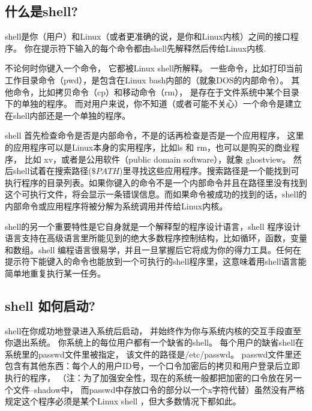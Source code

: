 \subsection{什么是shell?}
shell是你（用户）和Linux（或者更准确的说，是你和Linux内核）之间的接口程序。
你在提示符下输入的每个命令都由shell先解释然后传给Linux内核. \par
不论何时你键入一个命令，
它都被Linux shell所解释。
一些命令，比如打印当前工作目录命令（pwd），是包含在Linux bash内部的（就象DOS的内部命令）。
其他命令，比如拷贝命令（cp）和移动命令（rm），
是存在于文件系统中某个目录下的单独的程序。
而对用户来说，你不知道（或者可能不关心）一个命令是建立在shell内部还是一个单独的程序。
\par
shell 首先检查命令是否是内部命令，不是的话再检查是否是一个应用程序，
这里的应用程序可以是Linux本身的实用程序，比如ls 和 rm，也可以是购买的商业程序，
比如 xv，或者是公用软件（public domain software），就象 ghostview。
然后shell试着在搜索路径($\$PATH$)里寻找这些应用程序。搜索路径是一个能找到可执行程序的目录列表。如果你键入的命令不是一个内部命令并且在路径里没有找到这个可执行文件，将会显示一条错误信息。而如果命令被成功的找到的话，shell的内部命令或应用程序将被分解为系统调用并传给Linux内核。\par
shell的另一个重要特性是它自身就是一个解释型的程序设计语言，shell 程序设计语言支持在高级语言里所能见到的绝大多数程序控制结构，比如循环，函数，变量和数组。shell 编程语言很易学，并且一旦掌握后它将成为你的得力工具。任何在提示符下能键入的命令也能放到一个可执行的shell程序里，这意味着用shell语言能简单地重复执行某一任务。 \par
\subsection{shell 如何启动?}
shell在你成功地登录进入系统后启动，
并始终作为你与系统内核的交互手段直至你退出系统。
你系统上的每位用户都有一个缺省的shell。
每个用户的缺省shell在系统里的passwd文件里被指定，
该文件的路径是/etc/passwd。
passwd文件里还包含有其他东西：每个人的用户ID号，一个口令加密后的拷贝和用户登录后立即执行的程序，
（注：为了加强安全性，现在的系统一般都把加密的口令放在另一个文件--shadow中，
而passwd中存放口令的部分以一个x字符代替）虽然没有严格规定这个程序必须是某个Linux shell
，但大多数情况下都如此。 
 